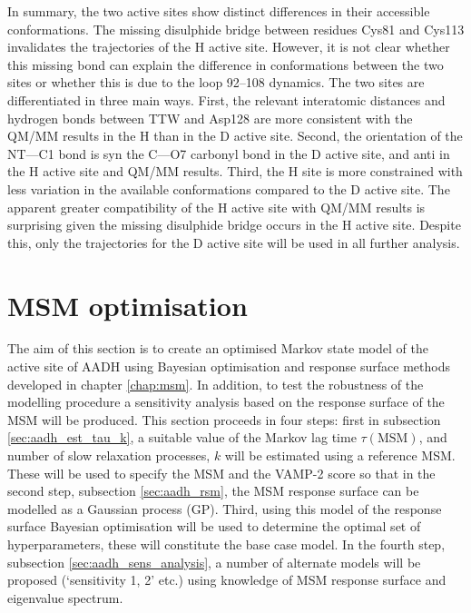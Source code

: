 In summary, the two active sites show distinct differences in their accessible conformations. The missing disulphide bridge between residues Cys81 and Cys113 invalidates the trajectories of the H active site. However, it is not clear whether this missing bond can explain the difference in conformations between the two sites or whether this is due to the loop \numrange[range-phrase=--]{92}{108} dynamics. The two sites are differentiated in three main ways. First, the relevant interatomic distances and hydrogen bonds between TTW and Asp128 are more consistent with the QM/MM results in the H than in the D active site. Second, the orientation of the NT---C1 bond is syn the C---O7 carbonyl bond in the D active site, and anti in the H active site and QM/MM results. Third, the H site is more constrained with less variation in the available conformations compared to the  D active site. The apparent greater compatibility of the H active site with QM/MM results is surprising given the missing disulphide bridge occurs in the H active site. Despite this, only the trajectories for the D active site will be used in all further analysis.  

\section{MSM optimisation}\label{sec:aadh_optimisation}

The aim of this section is to create an optimised Markov state model of the active site of AADH using Bayesian optimisation and response surface methods developed in chapter \ref{chap:msm}. In addition, to test the robustness of the modelling procedure a sensitivity analysis based on the response surface of the MSM will be produced. This section proceeds in four steps: first in subsection \ref{sec:aadh_est_tau_k}, a suitable  value of the Markov lag time $\tau(\mathrm{MSM})$, and number of slow relaxation processes, $k$ will be estimated using a reference MSM. These will be used to specify the MSM and the VAMP-2 score so that in the second step, subsection \ref{sec:aadh_rsm},  the MSM response surface can be modelled as a Gaussian process (GP). Third, using this model of the response surface Bayesian optimisation will be used to determine the optimal set of hyperparameters, these will constitute the base case model.  In the fourth step, subsection \ref{sec:aadh_sens_analysis}, a number of alternate models will be proposed (`sensitivity 1, 2' etc.)  using knowledge of MSM response surface and eigenvalue spectrum.  

